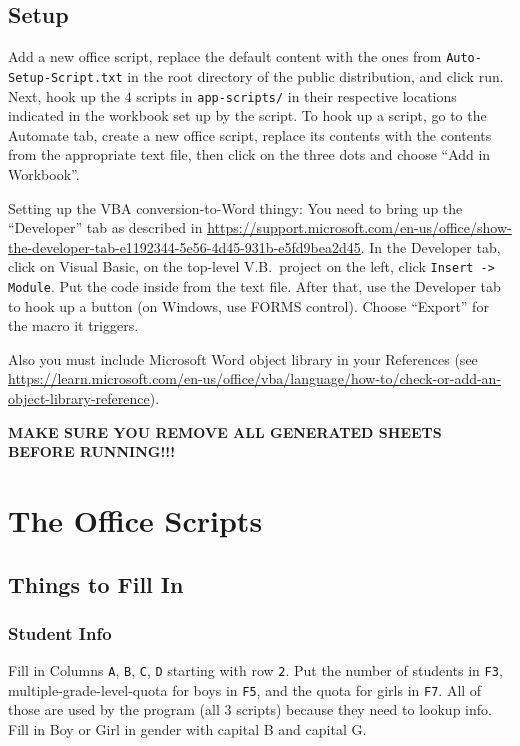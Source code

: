 \documentclass[openany,notitlepage]{book}
\begin{document}
	\section{Setup}
	
	Add a new office script, replace the default content with the ones from \verb|Auto-Setup-Script.txt| in the root
	directory of the public distribution, and click run. Next, hook up the $4$
	scripts in \verb|app-scripts/| in their respective locations indicated in the workbook set up by the script. To hook up a script, go to the Automate tab, create a new office script, replace its contents with the contents from the appropriate text file, then click on the three dots and choose ``Add in Workbook''.
	
	Setting up the VBA conversion-to-Word thingy: You need to bring up the ``Developer'' tab as described in
	\url{https://support.microsoft.com/en-us/office/show-the-developer-tab-e1192344-5e56-4d45-931b-e5fd9bea2d45}.
	In the Developer tab, click on Visual Basic, on the top-level V.B.\ project on the left, click \texttt{Insert -> Module}. Put the
	code inside from the text file. After that, use the Developer tab to hook up a button (on Windows, use FORMS control).
	Choose ``Export'' for the macro it triggers.
	
	Also you must include Microsoft Word object library in your References (see \url{https://learn.microsoft.com/en-us/office/vba/language/how-to/check-or-add-an-object-library-reference}).
	
	\textbf{MAKE SURE YOU REMOVE ALL GENERATED SHEETS BEFORE RUNNING!!!}
	

	\chapter{The Office Scripts}
	\section{Things to Fill In}
	\subsection{Student Info}\label{inf}
	Fill in Columns \verb|A|, \verb|B|, \verb|C|, \verb|D| starting with row \verb|2|. Put the number of students in \verb|F3|,
	multiple-grade-level-quota for boys in \verb|F5|, and the quota for girls in \verb|F7|. All of those are used by the
	program (all $3$ scripts) because they need to lookup info. Fill in Boy or Girl in gender with capital B and capital G.
	
\end{document}
